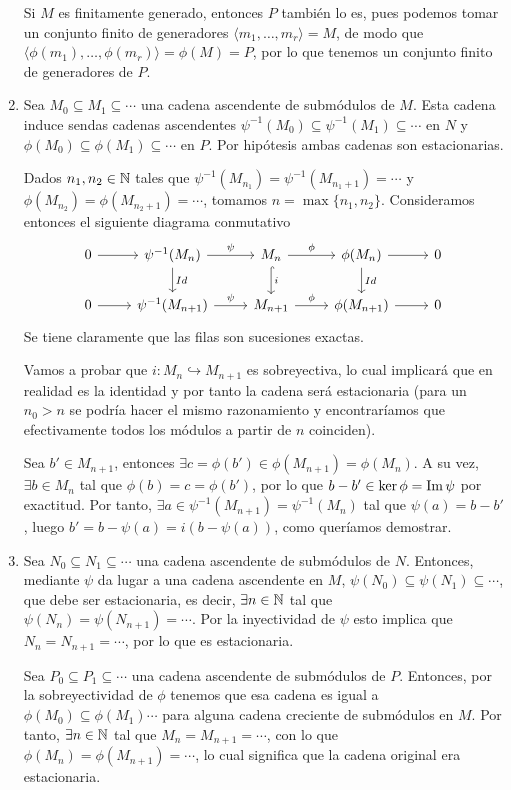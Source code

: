\documentclass[twoside]{article}
\begin{document}
\begin{solucion}
\begin{enumerate}
Si $M$ es finitamente generado, entonces $P$ también lo es, pues podemos tomar un conjunto finito de generadores $\langle m_1,\dots, m_r\rangle = M$, de modo que $\langle \phi(m_1),\dots, \phi(m_r)\rangle =\phi(M)=P$, por lo que tenemos un conjunto finito de generadores de $P$.

\item Sea $M_0\subseteq M_1\subseteq\cdots$ una cadena ascendente de submódulos de $M$. Esta cadena induce sendas cadenas ascendentes $\psi^{-1}(M_0)\subseteq\psi^{-1}(M_1)\subseteq\cdots$ en $N$ y $\phi(M_0)\subseteq\phi(M_1)\subseteq\cdots$ en $P$. Por hipótesis ambas cadenas son estacionarias. 

Dados $n_1,n_2\in\mathbb{N}$ tales que $\psi^{-1}(M_{n_1})=\psi^{-1}(M_{n_1+1})=\cdots$ y $\phi(M_{n_2})=\phi(M_{n_2+1})=\cdots$, tomamos $n=\max\{n_1,n_2\}$. Consideramos entonces el siguiente diagrama conmutativo
\[
\begin{tikzcd}
0\arrow[r] & \psi^{-1}(M_{n})\arrow[r,"\psi"]\arrow[d, "Id"] & M_n\arrow[r,"\phi"]\arrow[d, hookrightarrow, "i"] & \phi(M_{n})\arrow[d,"Id"]\arrow[r] & 0\\
0\arrow[r] & \psi^{-1}(M_{n+1})\arrow[r,"\psi"]& M_{n+1}\arrow[r,"\phi"] & \phi(M_{n+1})\arrow[r] & 0
\end{tikzcd}
\]
Se tiene claramente que las filas son sucesiones exactas. 

Vamos a probar que $i:M_n\hookrightarrow M_{n+1}$ es sobreyectiva, lo cual implicará que en realidad es la identidad y por tanto la cadena será estacionaria (para un $n_0>n$ se podría hacer el mismo razonamiento y encontraríamos que efectivamente todos los módulos a partir de $n$ coinciden).

Sea $b'\in M_{n+1}$, entonces $\exists c=\phi(b')\in\phi(M_{n+1})=\phi(M_n)$. A su vez, $\exists b\in M_n$ tal que $\phi(b)=c=\phi(b')$, por lo que $b-b'\in\ker\phi=\operatorname{Im}\psi$ por exactitud. Por tanto, $\exists a\in\psi^{-1}(M_{n+1})=\psi^{-1}(M_n)$ tal que $\psi(a)=b-b'$, luego $b'=b-\psi(a)=i(b-\psi(a))$, como queríamos demostrar.
 
  
\item Sea $N_0\subseteq N_1\subseteq\cdots$ una cadena ascendente de submódulos de $N$. Entonces, mediante $\psi$ da lugar a una cadena ascendente en $M$, $\psi(N_0)\subseteq \psi(N_1)\subseteq\cdots$, que debe ser estacionaria, es decir, $\exists n\in\mathbb{N}$ tal que $\psi(N_n)=\psi(N_{n+1})=\cdots$. Por la inyectividad de $\psi$ esto implica que $N_n=N_{n+1}=\cdots$, por lo que es estacionaria. 

Sea $P_0\subseteq P_1\subseteq\cdots$ una cadena ascendente de submódulos de $P$. Entonces, por la sobreyectividad de $\phi$ tenemos que esa cadena es igual a $\phi(M_0)\subseteq\phi(M_1)\cdots$ para alguna cadena creciente de submódulos en $M$. Por tanto, $\exists n\in\mathbb{N}$ tal que $M_n=M_{n+1}=\cdots$, con lo que $\phi(M_n)=\phi(M_{n+1})=\cdots$, lo cual significa que la cadena original era estacionaria. 
\end{enumerate}
\end{solucion}
\end{document}
